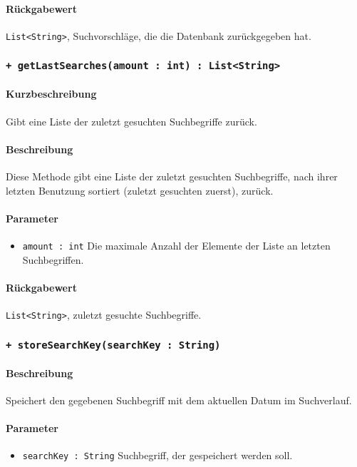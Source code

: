 \paragraph*{Rückgabewert}
\texttt{List<String>}, Suchvorschläge, die die Datenbank zurückgegeben hat.

 \subsubsection*{\texttt{+ getLastSearches(amount : int) : List<String>}}\label{App_Search_ISearchModel_getLastSearches}%
\paragraph*{Kurzbeschreibung}
Gibt eine Liste der zuletzt gesuchten Suchbegriffe zurück.
\paragraph*{Beschreibung}
Diese Methode gibt eine Liste der zuletzt gesuchten Suchbegriffe, nach ihrer letzten Benutzung sortiert (zuletzt gesuchten zuerst), zurück.
\paragraph*{Parameter}
\begin{itemize}
    \item \texttt{amount : int} Die maximale Anzahl der Elemente der Liste an letzten Suchbegriffen.
\end{itemize}
\paragraph*{Rückgabewert}
\texttt{List<String>}, zuletzt gesuchte Suchbegriffe.

 \subsubsection*{\texttt{+ storeSearchKey(searchKey : String)}}\label{App_Search_ISearchModel_storeSearchKey}%
\paragraph*{Beschreibung}
Speichert den gegebenen Suchbegriff mit dem aktuellen Datum im Suchverlauf.
\paragraph*{Parameter}
\begin{itemize}
    \item \texttt{searchKey : String} Suchbegriff, der gespeichert werden soll.
\end{itemize}
